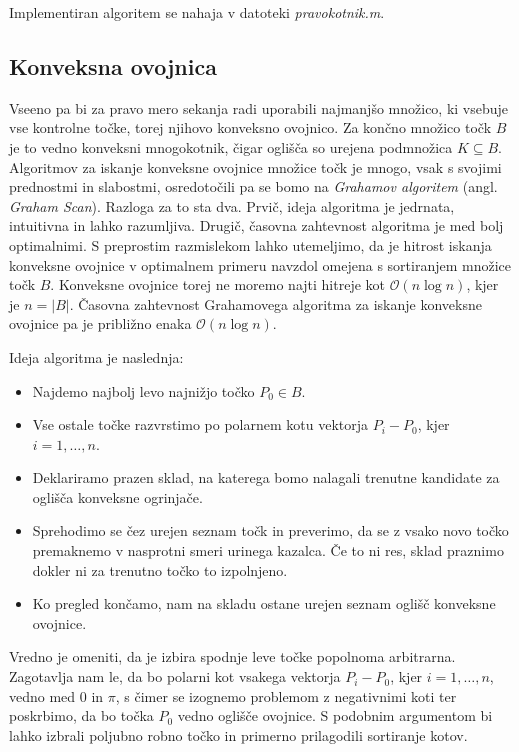 \documentclass[a4paper, 12pt]{article} %
\begin{document}
Implementiran algoritem se nahaja v datoteki \emph{pravokotnik.m}.

\subsection{Konveksna ovojnica}
Vseeno pa bi za pravo mero sekanja radi uporabili najmanjšo množico, ki vsebuje vse kontrolne točke, torej njihovo konveksno ovojnico. Za končno množico točk $B$ je to vedno konveksni mnogokotnik, čigar oglišča so urejena podmnožica $K \subseteq B$. Algoritmov za iskanje konveksne ovojnice množice točk je mnogo, vsak s svojimi prednostmi in slabostmi, osredotočili pa se bomo na \emph{Grahamov algoritem} (angl. \emph{Graham Scan}). Razloga za to sta dva. Prvič, ideja algoritma je jedrnata, intuitivna in lahko razumljiva. Drugič, časovna zahtevnost algoritma je med bolj optimalnimi. S preprostim razmislekom lahko utemeljimo, da je hitrost iskanja konveksne ovojnice v optimalnem primeru navzdol omejena s sortiranjem množice točk $B$. Konveksne ovojnice torej ne moremo najti hitreje kot $\mathcal{O}(n\log{}n)$, kjer je $n = |B|$. Časovna zahtevnost Grahamovega algoritma za iskanje konveksne ovojnice pa je približno enaka $\mathcal{O}(n\log{}n)$.

Ideja algoritma je naslednja:
\begin{itemize}
\item Najdemo najbolj levo najnižjo točko $P_0 \in B$.
\item Vse ostale točke razvrstimo po polarnem kotu vektorja $P_i - P_0$, kjer $i = 1, \dots, n$.
\item Deklariramo prazen sklad, na katerega bomo nalagali trenutne kandidate za oglišča konveksne ogrinjače.
\item Sprehodimo se čez urejen seznam točk in preverimo, da se z vsako novo točko premaknemo v nasprotni smeri urinega kazalca. Če to ni res, sklad praznimo dokler ni za trenutno točko to izpolnjeno.
\item Ko pregled končamo, nam na skladu ostane urejen seznam oglišč konveksne ovojnice.
\end{itemize}

Vredno je omeniti, da je izbira spodnje leve točke popolnoma arbitrarna. Zagotavlja nam le, da bo polarni kot vsakega vektorja $P_i - P_0$, kjer $i = 1, \dots, n$, vedno med $0$ in $\pi$, s čimer se izognemo problemom z negativnimi koti ter poskrbimo, da bo točka $P_0$ vedno oglišče ovojnice. S podobnim argumentom bi lahko izbrali poljubno robno točko in primerno prilagodili sortiranje kotov.
\end{document}
